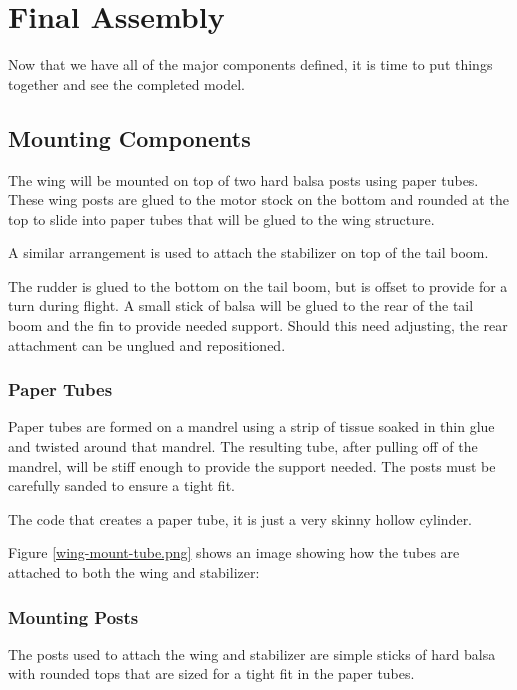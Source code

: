 \section*{Final Assembly}

Now that we have all of the major components defined, it is time to put things
together and see the completed model.

\subsection*{Mounting Components}

The wing will be mounted on top of two hard balsa posts using paper tubes.
These wing posts are glued to the motor stock on the bottom and rounded at the
top to slide into paper tubes that will be glued to the wing structure.

A similar arrangement is used to attach the stabilizer on top of the tail boom.

The rudder is glued to the bottom on the tail boom, but is offset to provide for
a turn during flight. A small stick of balsa will be glued to the rear of the
tail boom and the fin to provide needed support. Should this need adjusting,
the rear attachment can be unglued and repositioned.

\subsubsection*{Paper Tubes}

Paper tubes are formed on a mandrel using a strip of tissue soaked in thin
glue and twisted around that mandrel. The resulting tube, after pulling off of
the mandrel, will be stiff enough to provide the support needed. The posts must
be carefully sanded to ensure a tight fit.

The code that creates a paper tube, it is just a very skinny hollow cylinder.

Figure \ref{wing-mount-tube.png} shows an image showing how the tubes are attached
to both the wing and stabilizer:


\subsubsection*{Mounting Posts}

The posts used to attach the wing and stabilizer are simple sticks of hard balsa with
rounded tops that are sized for a tight fit in the paper tubes.

